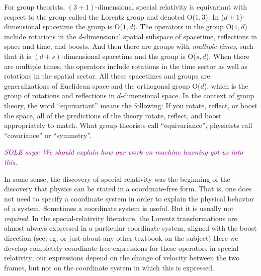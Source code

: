 \documentclass{article}
\newcommand{\plus}{\!+\!} %
\newcommand{\SOLE}[1]{\textcolor{purple}{\textsl{SOLE says: {#1}}}}
\begin{document}
For group theorists, $(3\plus1)$-dimensional special relativity is equivariant with respect to the group called the Lorentz group and denoted O($1,3$).
In ($d\plus1$)-dimensional spacetime the group is O($1,d$).
The operators in the group O($1,d$) include rotations in the $d$-dimensional spatial subspace of spacetime, reflections in space and time, and boosts.
And then there are groups with \emph{multiple times}, such that it is $(d\plus s)$-dimensional spacetime and the group is O($s,d$).
When there are multiple times, the operators include rotations in the time sector as well as rotations in the spatial sector.
All these spacetimes and groups are generalizations of Euclidean space and the orthogonal group O($d$), which is the group of rotations and reflections in $d$-dimensional space.
In the context of group theory, the word ``equivariant'' means the following:
If you rotate, reflect, or boost the space, all of the predictions of the theory rotate, reflect, and boost appropriately to match.
What group theorists call ``equivariance'', physicists call ``covariance'' or ``symmetry''.

\SOLE{We should explain how our work on machine learning got us into this.}

In some sense, the discovery of special relativity was the beginning of the discovery that physics can be stated in a coordinate-free form.
That is, one does not need to specify a coordinate system in order to explain the physical behavior of a system.
Sometimes a coordinate system is useful.
But it is usually not \emph{required}.
In the special-relativity literature, the Lorentz transformations are almost always expressed in a particular coordinate system, aligned with the boost direction (see, eg, \cite{french, zakamska} or just about any other textbook on the subject)
Here we develop completely coordinate-free expressions for these operators in special relativity; our expressions depend on the change of velocity between the two frames, but not on the coordinate system in which this is expressed.
\end{document}

